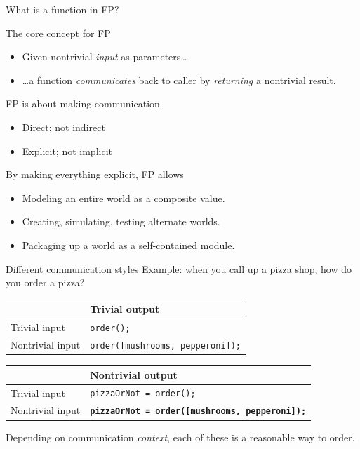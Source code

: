 \begin{frame}{What is a function in FP?}
  \begin{block}{The core concept for FP}
    \begin{itemize}
    \item Given nontrivial \emph{input} as parameters\ldots{}
    \item \ldots{}a function \emph{communicates} back to caller by \emph{returning} a nontrivial result.
    \end{itemize}
  \end{block}

  FP is about making communication
  \begin{itemize}
  \item Direct; not indirect
  \item Explicit; not implicit
  \end{itemize}

  By making everything explicit, FP allows
  \begin{itemize}
  \item Modeling an entire world as a composite value.
  \item Creating, simulating, testing alternate worlds.
  \item Packaging up a world as a self-contained module.
  \end{itemize}
\end{frame}

\begin{frame}[fragile]{Different communication styles}
  Example: when you call up a pizza shop, how do you order a pizza?

  \begin{table}
    \begin{tabular}{| l || l |}
      \toprule
      & Trivial output \\
      \midrule
      Trivial input
      & \texttt{order();} \\
      Nontrivial input
      & \texttt{order([mushrooms, pepperoni]);} \\
      \bottomrule
    \end{tabular}
  \end{table}

  \begin{table}
    \begin{tabular}{| l || l |}
      \toprule
      & Nontrivial output \\
      \midrule
      Trivial input
      & \texttt{pizzaOrNot = order();} \\
      Nontrivial input
      & \textbf{\texttt{pizzaOrNot = order([mushrooms, pepperoni]);}} \\
      \bottomrule
    \end{tabular}
  \end{table}

  Depending on communication \emph{context}, each of these is
  a reasonable way to order.
\end{frame}

